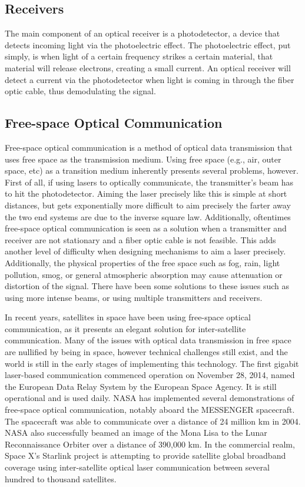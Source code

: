 \documentclass[11pt]{article}
\begin{document}
\subsection{Receivers}

The main component of an optical receiver is a photodetector, a device that detects incoming light via the photoelectric effect. The photoelectric effect, put simply, is when light of a certain frequency strikes a certain material, that material will release electrons, creating a small current. An optical receiver will detect a current via the photodetector when light is coming in through the fiber optic cable, thus demodulating the signal. 

\subsection{Free-space Optical Communication}

Free-space optical communication is a method of optical data transmission that uses free space as the transmission medium. Using free space (e.g., air, outer space, etc) as a transition medium inherently presents several problems, however. First of all, if using lasers to optically communicate, the transmitter’s beam has to hit the photodetector. Aiming the laser precisely like this is simple at short distances, but gets exponentially more difficult to aim precisely the farter away the two end systems are due to the inverse square law. Additionally, oftentimes free-space optical communication is seen as a solution when a transmitter and receiver are not stationary and a fiber optic cable is not feasible. This adds another level of difficulty when designing mechanisms to aim a laser precisely. Additionally, the physical properties of the free space such as fog, rain, light pollution, smog, or general atmospheric absorption may cause attenuation or distortion of the signal. There have been some solutions to these issues such as using more intense beams, or using multiple transmitters and receivers.

In recent years, satellites in space have been using free-space optical communication, as it presents an elegant solution for inter-satellite communication. Many of the issues with optical data transmission in free space are nullified by being in space, however technical challenges still exist, and the world is still in the early stages of implementing this technology. The first gigabit laser-based communication commenced operation on November 28, 2014, named the European Data Relay System by the European Space Agency. It is still operational and is used daily. NASA has implemented several demonstrations of free-space optical communication, notably aboard the MESSENGER spacecraft. The spacecraft was able to communicate over a distance of 24 million km in 2004. NASA also successfully beamed an image of the Mona Lisa to the Lunar Reconnaissance Orbiter over a distance of 390,000 km. In the commercial realm, Space X’s Starlink project is attempting to provide satellite global broadband coverage using inter-satellite optical laser communication between several hundred to thousand satellites. 

\nocite{*}
\printbibliography
\end{document}
